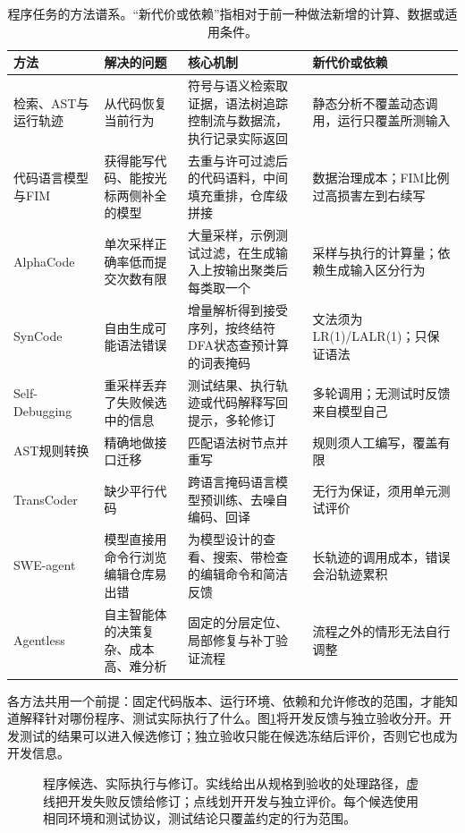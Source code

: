 \begin{table}[htbp]
  \centering
  \small
  \begin{tabularx}{\linewidth}{@{}l>{\raggedright\arraybackslash}X>{\raggedright\arraybackslash}X>{\raggedright\arraybackslash}X@{}}
    \toprule
    方法 & 解决的问题 & 核心机制 & 新代价或依赖 \\
    \midrule
    检索、AST与运行轨迹 & 从代码恢复当前行为 & 符号与语义检索取证据，语法树追踪控制流与数据流，执行记录实际返回 & 静态分析不覆盖动态调用，运行只覆盖所测输入 \\
    代码语言模型与FIM & 获得能写代码、能按光标两侧补全的模型 & 去重与许可过滤后的代码语料，中间填充重排，仓库级拼接 & 数据治理成本；FIM比例过高损害左到右续写 \\
    AlphaCode & 单次采样正确率低而提交次数有限 & 大量采样，示例测试过滤，在生成输入上按输出聚类后每类取一个 & 采样与执行的计算量；依赖生成输入区分行为 \\
    SynCode & 自由生成可能语法错误 & 增量解析得到接受序列，按终结符DFA状态查预计算的词表掩码 & 文法须为LR(1)/LALR(1)；只保证语法 \\
    Self-Debugging & 重采样丢弃了失败候选中的信息 & 测试结果、执行轨迹或代码解释写回提示，多轮修订 & 多轮调用；无测试时反馈来自模型自己 \\
    AST规则转换 & 精确地做接口迁移 & 匹配语法树节点并重写 & 规则须人工编写，覆盖有限 \\
    TransCoder & 缺少平行代码 & 跨语言掩码语言模型预训练、去噪自编码、回译 & 无行为保证，须用单元测试评价 \\
    SWE-agent & 模型直接用命令行浏览编辑仓库易出错 & 为模型设计的查看、搜索、带检查的编辑命令和简洁反馈 & 长轨迹的调用成本，错误会沿轨迹累积 \\
    Agentless & 自主智能体的决策复杂、成本高、难分析 & 固定的分层定位、局部修复与补丁验证流程 & 流程之外的情形无法自行调整 \\
    \bottomrule
  \end{tabularx}
  \caption{程序任务的方法谱系。“新代价或依赖”指相对于前一种做法新增的计算、数据或适用条件。}
  \label{tab:nlp-execution-program-methods}
\end{table}

各方法共用一个前提：固定代码版本、运行环境、依赖和允许修改的范围，才能知道解释针对哪份程序、测试实际执行了什么。图\ref{fig:nlp-execution-program-loop}将开发反馈与独立验收分开。开发测试的结果可以进入候选修订；独立验收只能在候选冻结后评价，否则它也成为开发信息。

\begin{figure}[htbp]
  \centering
  
  \caption{程序候选、实际执行与修订。实线给出从规格到验收的处理路径，虚线把开发失败反馈给修订；点线划开开发与独立评价。每个候选使用相同环境和测试协议，测试结论只覆盖约定的行为范围。}
  \label{fig:nlp-execution-program-loop}
\end{figure}
\FloatBarrier

